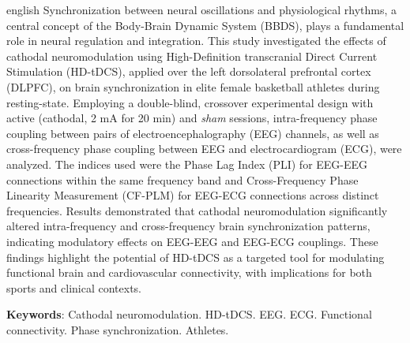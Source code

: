 \begin{resumo}[Abstract]
\begin{otherlanguage*}{english}
Synchronization between neural oscillations and physiological rhythms, a central concept of the Body-Brain Dynamic System (BBDS), plays a fundamental role in neural regulation and integration. This study investigated the effects of cathodal neuromodulation using High-Definition transcranial Direct Current Stimulation (HD-tDCS), applied over the left dorsolateral prefrontal cortex (DLPFC), on brain synchronization in elite female basketball athletes during resting-state. Employing a double-blind, crossover experimental design with active (cathodal, 2 mA for 20 min) and \textit{sham} sessions, intra-frequency phase coupling between pairs of electroencephalography (EEG) channels, as well as cross-frequency phase coupling between EEG and electrocardiogram (ECG), were analyzed. The indices used were the Phase Lag Index (PLI) for EEG-EEG connections within the same frequency band and Cross-Frequency Phase Linearity Measurement (CF-PLM) for EEG-ECG connections across distinct frequencies. Results demonstrated that cathodal neuromodulation significantly altered intra-frequency and cross-frequency brain synchronization patterns, indicating modulatory effects on EEG-EEG and EEG-ECG couplings. These findings highlight the potential of HD-tDCS as a targeted tool for modulating functional brain and cardiovascular connectivity, with implications for both sports and clinical contexts.

\vspace{\onelineskip}
 
\noindent 
\textbf{Keywords}: Cathodal neuromodulation. HD-tDCS. EEG. ECG. Functional connectivity. Phase synchronization. Athletes.
\end{otherlanguage*}
\end{resumo}